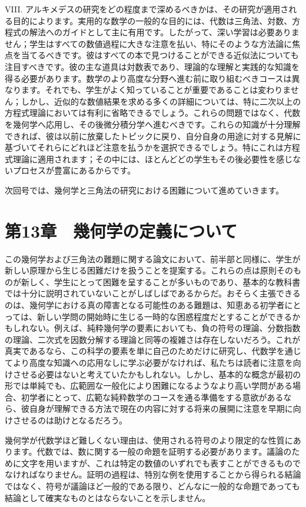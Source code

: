 \documentclass[a4paper,11pt,openany]{ltjsbook}
\begin{document}
VIII. アルキメデスの研究をどの程度まで深めるべきかは、その研究が適用される目的によります。実用的な数学の一般的な目的には、代数は三角法、対数、方程式の解法へのガイドとして主に有用です。したがって、深い学習は必要ありません；学生はすべての数値過程に大きな注意を払い、特にそのような方法論に焦点を当てるべきです。彼はすべての本で見つけることができる近似法についても注目すべきです。彼の主な道具は対数表であり、理論的な理解と実践的な知識を得る必要があります。数学のより高度な分野へ進む前に取り組むべきコースは異なります。それでも、学生がよく知っていることが重要であることは変わりません；しかし、近似的な数値結果を求める多くの詳細については、特に二次以上の方程式理論においては有利に省略できるでしょう。これらの問題ではなく、代数を幾何学へ応用し、その後微分積分学へ進むべきです。これらの知識が十分理解できれば、彼は以前に放棄したトピックに戻り、自分自身の用途に対する見解に基づいてそれらにどれほど注意を払うかを選択できるでしょう。特にこれは方程式理論に適用されます；その中には、ほとんどどの学生もその後必要性を感じないプロセスが豊富にあるからです。

次回号では、幾何学と三角法の研究における困難について進めていきます。

\chapter{第13章　幾何学の定義について}

この幾何学および三角法の難題に関する論文において、前半部と同様に、学生が新しい原理から生じる困難だけを扱うことを提案する。これらの点は原則そのものが新しく、学生にとって困難を呈することが多いものであり、基本的な教科書では十分に説明されていないことがしばしばであるからだ。おそらく主張できるのは、幾何学における真の障害となる可能性のある難題は、知恵ある初学者にとっては、新しい学問の開始時に生じる一時的な困惑程度だとすることができるかもしれない。例えば、純粋幾何学の要素においても、負の符号の理論、分数指数の理論、二次式を因数分解する理論と同等の複雑さは存在しないだろう。これが真実であるなら、この科学の要素を単に自己のためだけに研究し、代数学を通じてより高度な知識への応用なしに学ぶ必要がなければ、私たちは読者に注意を向けさせる必要はないと考えていたかもしれない。しかし、基本的な概念が最初の形では単純でも、広範囲な一般化により困難になるようなより高い学問がある場合、初学者にとって、広範な純粋数学のコースを通る準備をする意欲があるなら、彼自身が理解できる方法で現在の内容に対する将来の展開に注意を早期に向けさせるのは助けとなるだろう。

幾何学が代数学ほど難しくない理由は、使用される符号のより限定的な性質にあります。代数では、数に関する一般の命題を証明する必要があります。議論のために文字を用いますが、これは特定の数値のいずれでも表すことができるものでなければなりません。証明の過程は、特別な例を使用することから得られる結論ではなく、符号が議論ほど一般的である限り、どんなに一般的な命題であっても結論として確実なものとはならないことを示しません。
\end{document}
